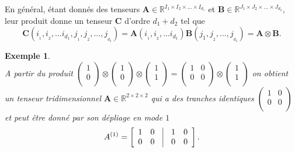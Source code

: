 \documentclass[11pt,a4paper,oneside]{book}
\newtheorem{ex}{Exemple}[chapter]}
\def\R{\mathbb R}
\newcommand{\mbf}[1]{\mathbf{#1}}
\begin{document}
En général, étant donnés des tenseurs $\mathbf{A} \in \R^{I_1 \times I_2\times \ldots \times I_{d_1}}$ et $\mathbf{B} \in \R^{J_1 \times J_2\times \ldots \times J_{d_2}},$ leur produit donne un tenseur $ \mbf{C} $ d'ordre $ d_{1} + d_{2} $ tel que
\begin{equation}
\mathbf{C}\left(i_{_1},i_{_2},\ldots i_{d_1},j_{_1},j_{_2},\ldots,j_{_{d_2}}\right) =   \mathbf{A}\left(i_{_1},i_{_2},\ldots i_{d_1}\right)\mathbf{B}\left({j_1},j_{_2}, \ldots,j_{_{d_2}}\right) = \mathbf{A} \otimes \mathbf{B}.
\end{equation}
\begin{ex}
\emph{\\}
A partir du produit $\begin{pmatrix}
1\\
0\\
\end{pmatrix}
\otimes
\begin{pmatrix}
1\\
0\\
\end{pmatrix}
\otimes
\begin{pmatrix}
1\\
1\\
\end{pmatrix}
= 
\begin{pmatrix}
1&0\\
0&0\\
\end{pmatrix}
\otimes
\begin{pmatrix}
1\\
1\\
\end{pmatrix}
$  on obtient un tenseur tridimensionnel $\mbf{A} \in \R^{2 \times 2 \times 2}$ qui a
des tranches identiques $\begin{pmatrix}
1&0\\
0&0\\
\end{pmatrix}$ et peut être donné par son dépliage en mode $ 1 $
$$A^{(1)}=
\begin{bmatrix}
\begin{array}{*{5}{c}}
1&0&\vline&1&0\\
0&0&\vline&0&0
\end{array}
\end{bmatrix}.
$$
\end{ex}
\end{document}
